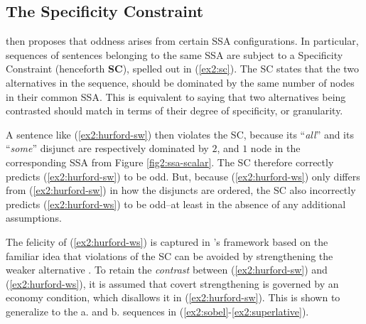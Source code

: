 \subsection{The Specificity Constraint}
\citet{Ippolito2019} then proposes that oddness arises from certain SSA configurations. In particular, sequences of sentences belonging to the same SSA are subject to a Specificity Constraint (henceforth \textbf{SC}), spelled out in (\ref{ex2:sc}). The SC states that the two alternatives in the sequence, should be dominated by the same number of nodes in their common SSA. This is equivalent to saying that two alternatives being contrasted should match in terms of their degree of specificity, or granularity.


\begin{exe}
	\label{ex2:sc}
\end{exe}

A sentence like (\ref{ex2:hurford-sw}) then violates the SC, because its ``\textit{all}'' and its ``\textit{some}'' disjunct are respectively dominated by $2$, and $1$ node in the corresponding SSA from Figure \ref{fig2:ssa-scalar}. The SC therefore correctly predicts (\ref{ex2:hurford-sw}) to be odd. But, because (\ref{ex2:hurford-ws}) only differs from (\ref{ex2:hurford-sw}) in how the disjuncts are ordered, the SC also incorrectly predicts (\ref{ex2:hurford-ws}) to be odd--at least in the absence of any additional assumptions.

The felicity of (\ref{ex2:hurford-ws}) is captured in \citet{Ippolito2019}'s framework based on the familiar idea that violations of the SC can be avoided by strengthening the weaker alternative \citep{Gazdar1979,Singh2008a,Singh2008b,Chierchia2009,Fox2018}. To retain the \textit{contrast} between  (\ref{ex2:hurford-sw}) and  (\ref{ex2:hurford-ws}), it is assumed that covert strengthening is governed by an economy condition, which disallows it in (\ref{ex2:hurford-sw}). This is shown to generalize to the a. and b. sequences in (\ref{ex2:sobel}-\ref{ex2:superlative}).


